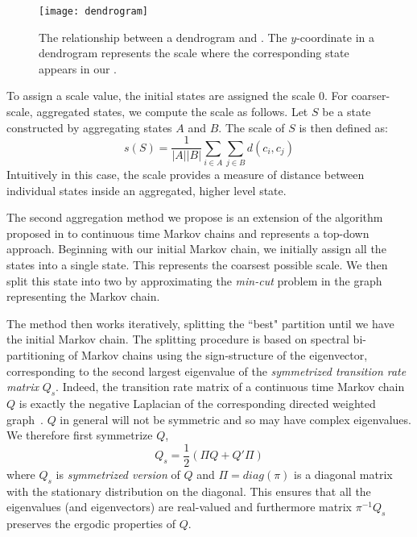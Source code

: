 \begin{figure}[h!]
	\centering
	\texttt{[image: dendrogram]}
	\caption{The relationship between a dendrogram and . The $y$-coordinate in a dendrogram represents the scale where the corresponding state appears in our .}
	\label{fig:dendrogram}
\end{figure}
%
To assign a scale value, the initial states are assigned the scale $0$. For coarser-scale, aggregated states, we compute the scale as follows. Let $S$ be a state constructed by aggregating states $A$ and $B$.  The scale of $S$ is then defined as:
\begin{equation}
	\nonumber
	s(S) = \frac{1}{\left|A\right|\left|B\right|}\sum\limits_{i \in A}\sum\limits_{j \in B} d(c_i,c_j)
\end{equation}
Intuitively in this case, the scale provides a measure of distance between individual states inside an aggregated, higher level state.


The second aggregation method we propose is an extension of the algorithm proposed in  to continuous time Markov chains and represents a top-down approach. Beginning with our initial Markov chain, we initially assign all the states into a single state. This represents the coarsest possible scale. We then split this state into two by approximating the \emph{min-cut} problem in the graph representing the Markov chain. 

The method then works iteratively, splitting the ``best" partition until we have the initial Markov chain.
%
The splitting procedure is based on spectral bi-partitioning of Markov chains using the sign-structure of the eigenvector, corresponding to the second largest eigenvalue of the \emph{symmetrized transition rate matrix} $Q_s$. Indeed,  the transition rate matrix of a continuous time Markov chain $Q$ is exactly the negative Laplacian of the corresponding directed weighted graph~\cite{Agaev2005157}.
%
$Q$ in general will not be symmetric and so may have complex eigenvalues. We therefore first symmetrize $Q$,
\begin{equation}
	\nonumber
	Q_s = \frac{1}{2}(\Pi Q + Q' \Pi)
\end{equation}
where $Q_s$ is \emph{symmetrized version} of $Q$ and $\Pi = diag(\pi)$ is a diagonal matrix with the stationary distribution on the diagonal. This ensures that all the eigenvalues (and eigenvectors) are real-valued and furthermore matrix $\pi^{-1}Q_s$ preserves the ergodic properties of $Q$. 

